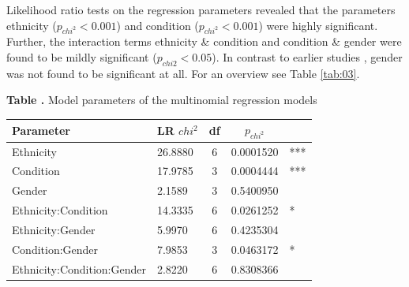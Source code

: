 \documentclass{frontiersSCNS} %
\begin{document}
Likelihood ratio tests on the regression parameters revealed that the parameters ethnicity ($p_{chi^2} < 0.001$) and condition ($p_{chi^2} < 0.001$) were highly significant. Further, the interaction terms ethnicity \& condition and condition \& gender were found to be mildly significant ($p_{chi2}<0.05$). In contrast to earlier studies \citep{Goeke2013}, gender was not found to be significant at all. For an overview see Table \ref{tab:03}.

\begin{table}[h!]
\textbf{\label{tab:03} Table .}{ Model parameters of the multinomial regression models}
\label{tab:LRT}
\begin{center}
\begin{tabular}{ l l c c l }
 
 Parameter & LR $chi^2$ & df & $p_{chi^2}$ &  \\ 
 \hline
 
 Ethnicity & 26.8880 & 6 & 0.0001520 & ***\\ 

 Condition & 17.9785 & 3 & 0.0004444 & ***\\ 

 Gender & 2.1589 & 3 & 0.5400950 & \\ 

 Ethnicity:Condition & 14.3335 & 6 & 0.0261252 & *\\ 

 Ethnicity:Gender & 5.9970 & 6 & 0.4235304 &\\ 

 Condition:Gender & 7.9853 & 3 & 0.0463172 & *\\ 
 
 Ethnicity:Condition:Gender & 2.8220 & 6 & 0.8308366 & \\ 

\end{tabular}
\end{center}
\end{table}
\end{document}
